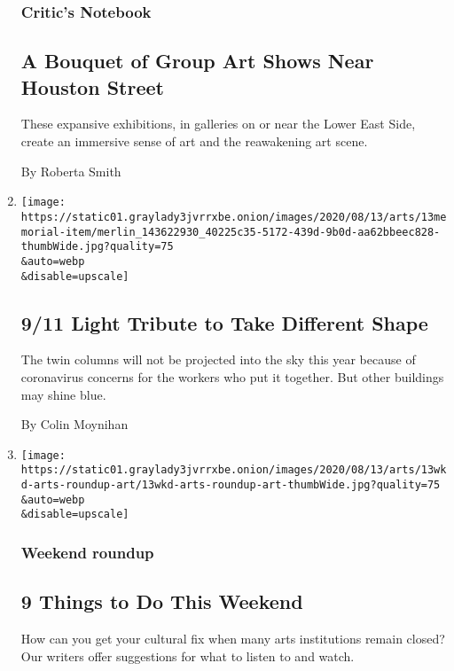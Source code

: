 \begin{enumerate}
  \hypertarget{critics-notebook-2}{%
  \subsubsection{Critic's Notebook}\label{critics-notebook-2}}

  \hypertarget{a-bouquet-of-group-art-shows-near-houston-street}{%
  \subsection{A Bouquet of Group Art Shows Near Houston
  Street}\label{a-bouquet-of-group-art-shows-near-houston-street}}

  These expansive exhibitions, in galleries on or near the Lower East
  Side, create an immersive sense of art and the reawakening art scene.

  By Roberta Smith
\item
  \href{/2020/08/13/arts/design/september-11-memorial-light-canceled-coronavirus.html}{}

  \texttt{[image: https://static01.graylady3jvrrxbe.onion/images/2020/08/13/arts/13memorial-item/merlin\_143622930\_40225c35-5172-439d-9b0d-aa62bbeec828-thumbWide.jpg?quality=75\\\&auto=webp\\\&disable=upscale]}

  \hypertarget{911-light-tribute-to-take-different-shape}{%
  \subsection{9/11 Light Tribute to Take Different
  Shape}\label{911-light-tribute-to-take-different-shape}}

  The twin columns will not be projected into the sky this year because
  of coronavirus concerns for the workers who put it together. But other
  buildings may shine blue.

  By Colin Moynihan
\item
  \href{/2020/08/13/arts/things-to-do-weekend-coronavirus.html}{}

  \texttt{[image: https://static01.graylady3jvrrxbe.onion/images/2020/08/13/arts/13wkd-arts-roundup-art/13wkd-arts-roundup-art-thumbWide.jpg?quality=75\\\&auto=webp\\\&disable=upscale]}

  \hypertarget{weekend-roundup-1}{%
  \subsubsection{Weekend roundup}\label{weekend-roundup-1}}

  \hypertarget{9-things-to-do-this-weekend}{%
  \subsection{9 Things to Do This
  Weekend}\label{9-things-to-do-this-weekend}}

  How can you get your cultural fix when many arts institutions remain
  closed? Our writers offer suggestions for what to listen to and watch.
\end{enumerate}

